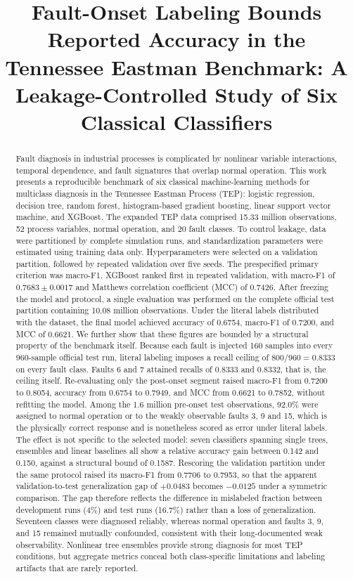 \documentclass[12pt,a4paper]{article}
\title{\textbf{Fault-Onset Labeling Bounds Reported Accuracy in the Tennessee
Eastman Benchmark: A Leakage-Controlled Study of Six Classical Classifiers}}
\author{}
\date{}
\begin{document}
\maketitle

\begin{abstract}
Fault diagnosis in industrial processes is complicated by nonlinear variable
interactions, temporal dependence, and fault signatures that overlap normal
operation. This work presents a reproducible benchmark of six classical
machine-learning methods for multiclass diagnosis in the Tennessee Eastman
Process (TEP): logistic regression, decision tree, random forest,
histogram-based gradient boosting, linear support vector machine, and XGBoost.
The expanded TEP data comprised 15.33 million observations, 52 process
variables, normal operation, and 20 fault classes. To control leakage, data
were partitioned by complete simulation runs, and standardization parameters
were estimated using training data only. Hyperparameters were selected on a
validation partition, followed by repeated validation over five seeds. The
prespecified primary criterion was macro-F1. XGBoost ranked first in repeated
validation, with macro-F1 of $0.7683\pm0.0017$ and Matthews correlation
coefficient (MCC) of $0.7426$. After freezing the model and protocol, a single
evaluation was performed on the complete official test partition containing
10.08 million observations. Under the literal labels distributed with the
dataset, the final model achieved accuracy of 0.6754, macro-F1 of 0.7200, and
MCC of 0.6621. We further show that these figures are bounded by a structural
property of the benchmark itself. Because each fault is injected 160 samples
into every 960-sample official test run, literal labeling imposes a recall
ceiling of $800/960=0.8333$ on every fault class. Faults 6 and 7 attained
recalls of 0.8333 and 0.8332, that is, the ceiling itself. Re-evaluating only
the post-onset segment raised macro-F1 from 0.7200 to 0.8054, accuracy from 0.6754 to
0.7949, and MCC from 0.6621 to 0.7852, without refitting the model. Among the
1.6 million pre-onset test observations, 92.0\% were assigned to normal
operation or to the weakly observable faults 3, 9 and 15, which is the
physically correct response and is nonetheless scored as error under literal
labels. The effect is not specific to the selected model: seven classifiers
spanning single trees, ensembles and linear baselines all show a relative
accuracy gain between 0.142 and 0.150, against a structural bound of 0.1587. Rescoring the validation partition under the same protocol raised its macro-F1
from 0.7706 to 0.7953, so that the apparent validation-to-test generalization
gap of $+0.0483$ becomes $-0.0125$ under a symmetric comparison. The gap
therefore reflects the difference in mislabeled fraction between development
runs (4\%) and test runs (16.7\%) rather than a loss of generalization. Seventeen classes were diagnosed reliably, whereas normal
operation and faults 3, 9, and 15 remained mutually confounded, consistent with
their long-documented weak observability. Nonlinear tree ensembles provide
strong diagnosis for most TEP conditions, but aggregate metrics conceal both
class-specific limitations and labeling artifacts that are rarely reported.
\end{abstract}
\end{document}
